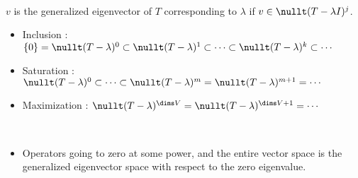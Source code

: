      \\
    $v$ is the generalized eigenvector of $T$ corresponding to $\lambda$ if $v \in \nullt(T-\lambda
    I)^j$. \\

    \begin{itemize}
        \item Inclusion : $\{0\} = \nullt(T-\lambda)^{0} \subset \nullt(T-\lambda)^{1} \subset \cdots
            \subset \nullt(T-\lambda)^{k} \subset \cdots$
        \item Saturation : $\nullt(T-\lambda)^{0} \subset \cdots \subset
            \nullt(T-\lambda)^{m} = \nullt(T-\lambda)^{m+1} = \cdots$
        \item Maximization : $\nullt(T-\lambda)^{\dims V} = \nullt(T-\lambda)^{\dims V+1} = \cdots$
    \end{itemize}

     \\

    \begin{itemize}
        \item Operators going to zero at some power, and the entire vector space is the generalized
            eigenvector space with respect to the zero eigenvalue.
    \end{itemize}





